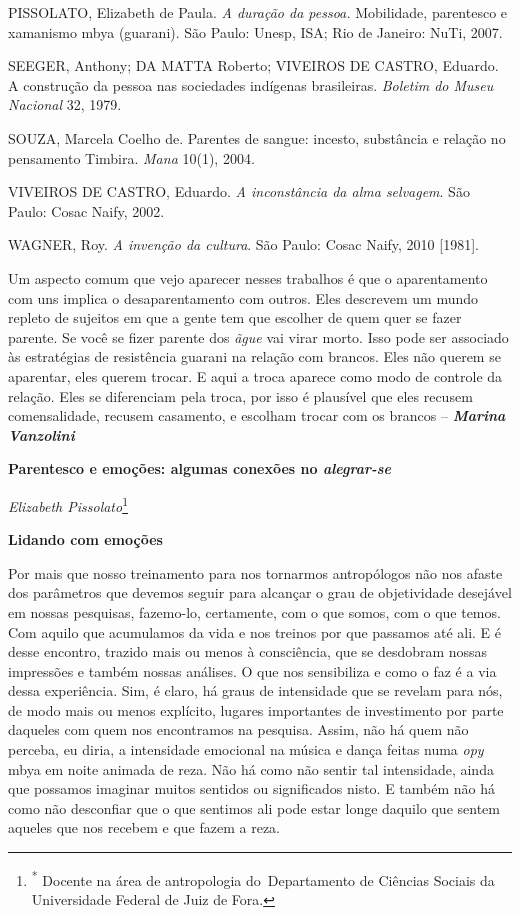 PISSOLATO, Elizabeth de Paula. \emph{A duração da pessoa.} Mobilidade,
parentesco e xamanismo mbya (guarani). São Paulo: Unesp, ISA; Rio de
Janeiro: NuTi, 2007.

SEEGER, Anthony; DA MATTA Roberto; VIVEIROS DE CASTRO, Eduardo. A
construção da pessoa nas sociedades indígenas brasileiras. \emph{Boletim
do Museu Nacional} 32, 1979.

SOUZA, Marcela Coelho de. Parentes de sangue: incesto, substância e
relação no pensamento Timbira. \emph{Mana} 10(1), 2004.

VIVEIROS DE CASTRO, Eduardo. \emph{A inconstância da alma selvagem}. São
Paulo: Cosac Naify, 2002.

WAGNER, Roy. \emph{A invenção da cultura}. São Paulo: Cosac Naify, 2010
{[}1981{]}.

Um aspecto comum que vejo aparecer nesses trabalhos é que o
aparentamento com uns implica o desaparentamento com outros. Eles
descrevem um mundo repleto de sujeitos em que a gente tem que escolher
de quem quer se fazer parente. Se você se fizer parente dos \emph{ãgue}
vai virar morto. Isso pode ser associado às estratégias de resistência
guarani na relação com brancos. Eles não querem se aparentar, eles
querem trocar. E aqui a troca aparece como modo de controle da relação.
Eles se diferenciam pela troca, por isso é plausível que eles recusem
comensalidade, recusem casamento, e escolham trocar com os brancos --
\emph{\textbf{Marina Vanzolini}}

\textbf{Parentesco e emoções: algumas conexões no \emph{alegrar-se}}

\emph{Elizabeth Pissolato}\footnote{\textsuperscript{*} Docente na área
  de antropologia do~Departamento de Ciências Sociais da Universidade
  Federal de Juiz de Fora.}

\textbf{Lidando com emoções}

Por mais que nosso treinamento para nos tornarmos antropólogos não nos
afaste dos parâmetros que devemos seguir para alcançar o grau de
objetividade desejável em nossas pesquisas, fazemo-lo, certamente, com o
que somos, com o que temos. Com aquilo que acumulamos da vida e nos
treinos por que passamos até ali. E é desse encontro, trazido mais ou
menos à consciência, que se desdobram nossas impressões e também nossas
análises. O que nos sensibiliza e como o faz é a via dessa experiência.
Sim, é claro, há graus de intensidade que se revelam para nós, de modo
mais ou menos explícito, lugares importantes de investimento por parte
daqueles com quem nos encontramos na pesquisa. Assim, não há quem não
perceba, eu diria, a intensidade emocional na música e dança feitas numa
\emph{opy} mbya em noite animada de reza. Não há como não sentir tal
intensidade, ainda que possamos imaginar muitos sentidos ou significados
nisto. E também não há como não desconfiar que o que sentimos ali pode
estar longe daquilo que sentem aqueles que nos recebem e que fazem a
reza.

